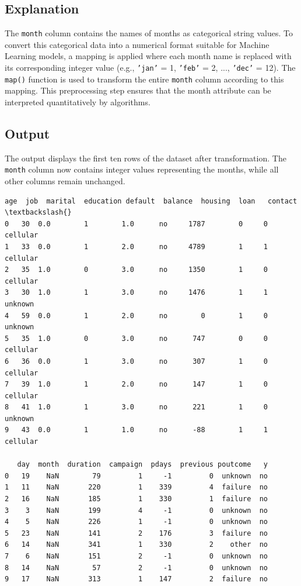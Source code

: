 \documentclass[11pt,a4paper]{report}
\makeatletter
\newcommand{\boxspacing}{\kern\kvtcb@left@rule\kern\kvtcb@boxsep}
\newcommand{\prompt}[4]{
        {\ttfamily\llap{{\color{#2}[#3]:\hspace{3pt}#4}}\vspace{-\baselineskip}}
    }
\makeatother
\begin{document}
\subsection*{Explanation}
The \texttt{month} column contains the names of months as categorical string values. To convert this categorical data into a numerical format suitable for Machine Learning models, a mapping is applied where each month name is replaced with its corresponding integer value (e.g., \texttt{'jan'} = 1, \texttt{'feb'} = 2, ..., \texttt{'dec'} = 12). The \texttt{map()} function is used to transform the entire \texttt{month} column according to this mapping. This preprocessing step ensures that the month attribute can be interpreted quantitatively by algorithms.

\subsection*{Output}
The output displays the first ten rows of the dataset after transformation. The \texttt{month} column now contains integer values representing the months, while all other columns remain unchanged.
            \begin{tcolorbox}[breakable, size=fbox, boxrule=.5pt, pad at break*=1mm, opacityfill=0]
\prompt{Out}{outcolor}{11}{\boxspacing}
\begin{Verbatim}[commandchars=\\\{\}]
   age  job  marital  education default  balance  housing  loan   contact  \textbackslash{}
0   30  0.0        1        1.0      no     1787        0     0  cellular
1   33  0.0        1        2.0      no     4789        1     1  cellular
2   35  1.0        0        3.0      no     1350        1     0  cellular
3   30  1.0        1        3.0      no     1476        1     1   unknown
4   59  0.0        1        2.0      no        0        1     0   unknown
5   35  1.0        0        3.0      no      747        0     0  cellular
6   36  0.0        1        3.0      no      307        1     0  cellular
7   39  1.0        1        2.0      no      147        1     0  cellular
8   41  1.0        1        3.0      no      221        1     0   unknown
9   43  0.0        1        1.0      no      -88        1     1  cellular

   day  month  duration  campaign  pdays  previous poutcome   y
0   19    NaN        79         1     -1         0  unknown  no
1   11    NaN       220         1    339         4  failure  no
2   16    NaN       185         1    330         1  failure  no
3    3    NaN       199         4     -1         0  unknown  no
4    5    NaN       226         1     -1         0  unknown  no
5   23    NaN       141         2    176         3  failure  no
6   14    NaN       341         1    330         2    other  no
7    6    NaN       151         2     -1         0  unknown  no
8   14    NaN        57         2     -1         0  unknown  no
9   17    NaN       313         1    147         2  failure  no
\end{Verbatim}
\end{tcolorbox}
        
\end{document}
